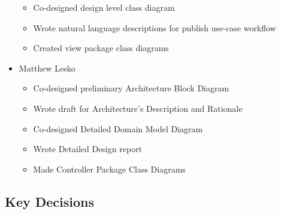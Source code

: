 \documentclass[12pt]{article}
\begin{document}
\begin{itemize}
    \begin{itemize}
        \item Co-designed design level class diagram
       	\item Wrote natural language descriptions for publish use-case workflow
       	\item Created view package class diagrams
    \end{itemize}
    \item Matthew Lesko
    \begin{itemize}
    	\item Co-designed preliminary Architecture Block Diagram
    	\item Wrote draft for Architecture's Description and Rationale
    	\item Co-designed Detailed Domain Model Diagram
    	\item Wrote Detailed Design report
    	\item Made Controller Package Class Diagrams
    \end{itemize}
\end{itemize}

\subsection{Key Decisions}
\end{document}
